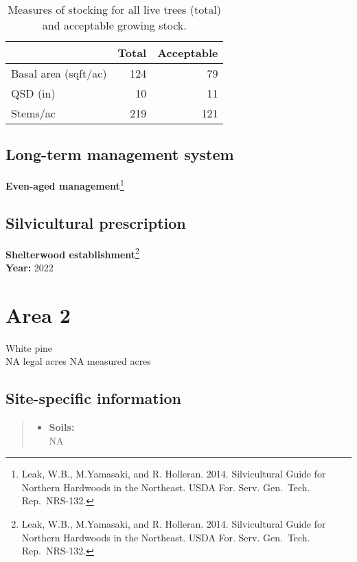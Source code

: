\documentclass[]{tufte-handout}
\providecommand{\tightlist}{%
  \setlength{\itemsep}{0pt}\setlength{\parskip}{0pt}}
\begin{document}
\begin{table}

\caption{\label{tab:unnamed-chunk-5}Measures of stocking for all live trees (total) and acceptable growing stock.}
\centering
\begin{tabular}[t]{lrr}
\toprule
  & Total & Acceptable\\
\midrule
Basal area (sqft/ac) & 124 & 79\\
QSD (in) & 10 & 11\\
Stems/ac & 219 & 121\\
\bottomrule
\end{tabular}
\end{table}

\subsection{Long-term management
system}\label{long-term-management-system}

\textbf{Even-aged management}\footnote{Leak, W.B., M.Yamasaki, and R.
  Holleran. 2014. Silvicultural Guide for Northern Hardwoods in the
  Northeast. USDA For. Serv. Gen.~Tech. Rep.~NRS-132.}

\subsection{Silvicultural
prescription}\label{silvicultural-prescription}

\textbf{Shelterwood establishment}\footnote{Leak, W.B., M.Yamasaki, and
  R. Holleran. 2014. Silvicultural Guide for Northern Hardwoods in the
  Northeast. USDA For. Serv. Gen.~Tech. Rep.~NRS-132.}\\
\textbf{Year:} 2022

\newpage

\section{Area 2}\label{area-2}

White pine\\
\noindent NA legal acres \textbar{} NA measured acres

\subsection{Site-specific
information}\label{site-specific-information-1}

\begin{quote}
\begin{itemize}
\tightlist
\item
  \textbf{Soils:}\\
  \indent\indent  NA
\end{itemize}
\end{quote}
\end{document}

